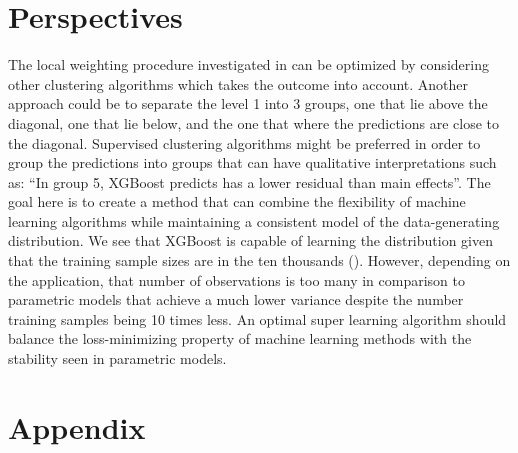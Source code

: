 \documentclass[11pt, a4paper]{article}
\theoremstyle{definition}
\theoremstyle{remark}
\begin{document}
\section{Perspectives}
The local weighting procedure investigated in  can be optimized by considering other clustering algorithms which takes the outcome into account. Another approach could be to separate the level 1 into 3 groups, one that lie above the diagonal, one that lie below, and the one that where the predictions are close to the diagonal. Supervised clustering algorithms might be preferred in order to group the predictions into groups that can have qualitative interpretations such as: ``In group 5, XGBoost predicts has a lower residual than main effects''. The goal here is to create a method that can combine the flexibility of machine learning algorithms while maintaining a consistent model of the data-generating distribution. We see that XGBoost is capable of learning the distribution given that the training sample sizes are in the ten thousands (). However, depending on the application, that number of observations is too many in comparison to parametric models that achieve a much lower variance despite the number training samples being 10 times less. An optimal super learning algorithm should balance the loss-minimizing property of machine learning methods with the stability seen in parametric models. 



\newpage

\section{Appendix}
\end{document}
